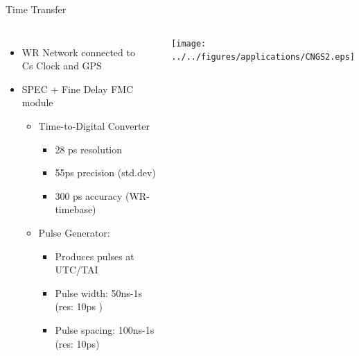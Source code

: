 \documentclass[compress,red]{beamer}
\begin{document}
\begin{frame}{Time Transfer}
  \begin{columns}[c]
      \begin{itemize}
	\item WR Network connected to \\ Cs Clock and GPS
	\item SPEC + Fine Delay FMC module
	\begin{itemize}
	  \item Time-to-Digital Converter
	  \begin{itemize}
	    \item 28 ps resolution
	    \item 55ps precision (std.dev)
	    \item 300 ps accuracy (WR-timebase)
	  \end{itemize}
	  \item Pulse Generator:
	  \begin{itemize}
	    \item Produces pulses at UTC/TAI
	    \item Pulse width: 50ns-1s (res: 10ps )
	    \item Pulse spacing: 100ns-1s (res: 10ps)
	  \end{itemize}
	\end{itemize}
      \end{itemize}
      \begin{center}
	\texttt{[image: ../../figures/applications/CNGS2.eps]}
      \end{center}
  \end{columns}
\end{frame}
% 
% 
%  
\end{document}
